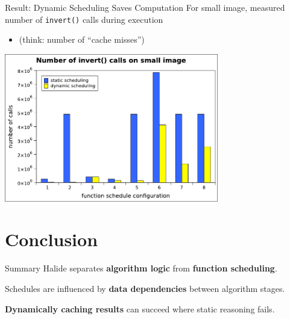 \documentclass[xcolor=dvipsnames]{beamer}
\begin{document}
\begin{frame}{Result: Dynamic Scheduling Saves Computation}
	For small image, measured number of \texttt{invert()} calls during execution
	\begin{itemize}
		\item (think: number of ``cache misses'')
	\end{itemize}
	\linegap

	\begin{center}
	\includegraphics[width=0.7\textwidth]{graphs/small.pdf}
	\end{center}
\end{frame}

\section{Conclusion}


\begin{frame}{Summary}
	Halide separates {\bf algorithm logic} from {\bf function scheduling}.
	\linegap

	Schedules are influenced by {\bf data dependencies} between algorithm stages.
	\linegap

	\textbf{Dynamically caching results} can succeed where static reasoning fails.
\end{frame}
\end{document}
